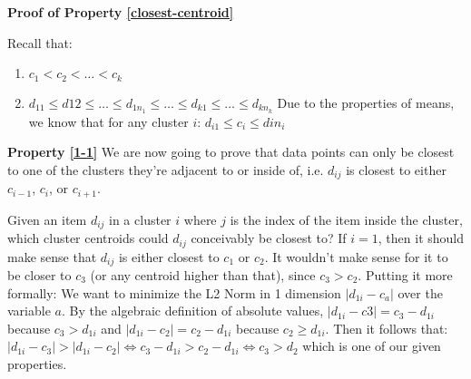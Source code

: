 \documentclass[conference,compsoc]{IEEEtran}
\newtheorem{subprp}{Property}[proofprp]
\begin{document}
        


\textbf{Proof of Property \ref{closest-centroid}}

Recall that:
\begin{enumerate}
\item $c_1 < c_2 < \dots < c_k$
\item $d_{11} \leq d12 \leq \dots \leq d_{1n_1} \leq \dots \leq d_{k1} \leq \dots \leq d_{kn_k}$
Due to the properties of means, we know that for any cluster $i$:
$d_{i1} \leq c_i \leq din_i$
\end{enumerate}

\textbf{Property \ref{1-1}}
We are now going to prove that data points can only be closest to one of the clusters they’re adjacent to or inside of,
i.e. $d_{ij}$ is closest to either $c_{i-1}$, $c_i$, or $c_{i+1}$.

Given an item $d_{ij}$ in a cluster $i$ where $j$ is the index of the item inside the cluster, which cluster centroids could $d_{ij}$ conceivably be closest to?
If $i=1$, then it should make sense that $d_{ij}$ is either closest to $c_1$ or $c_2$. It wouldn’t make sense for it to be closer to $c_3$ (or any centroid higher than that), since $c_3 > c_2$.
Putting it more formally: We want to minimize the L2 Norm in 1 dimension $|d_{1i} - c_a|$ over the variable $a$.
By the algebraic definition of absolute values, $|d_{1i}-c3| = c_3-d_{1i}$ because $c_3 > d_{1i}$ and $|d_{1i}-c_2| = c_2-d_{1i}$ because $c_2 \geq d_{1i}$.
Then it follows that:
$|d_{1i} - c_3| > |d_{1i} - c_2| \iff c_3 - d_{1i} > c_2 - d_{1i} \iff c_3 > d_2$ which is one of our given properties.
\end{document}
